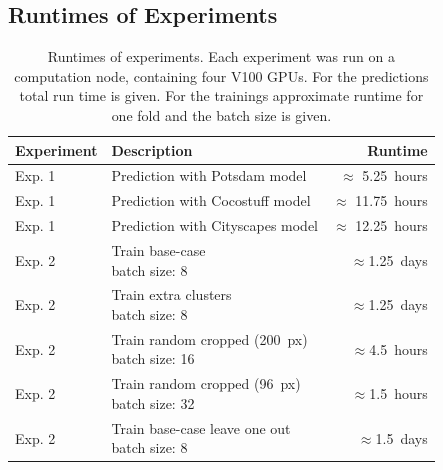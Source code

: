 \subsection{Runtimes of Experiments}
\begin{table}[!htb]
\centering
\makegapedcells
\begin{tabular}{|l|l|r|}
    \hline
    \textbf{Experiment} & \textbf{Description} & \textbf{Runtime} \\
    \hline
    Exp. 1 & Prediction with Potsdam model & $\approx$ 5.25~hours\\ \hline
    Exp. 1 & Prediction with Cocostuff model & $\approx$ 11.75~hours\\ \hline
    Exp. 1 & Prediction with Cityscapes model & $\approx$ 12.25~hours\\ \hline
    \hline
    Exp. 2 & \makecell[l]{Train base-case\\batch size: 8} & $\approx$1.25~days\\ \hline
    Exp. 2 & \makecell[l]{Train extra clusters\\batch size: 8} & $\approx$1.25~days\\ \hline
    Exp. 2 & \makecell[l]{Train random cropped (200~px)\\batch size: 16} & $\approx$4.5~hours\\ \hline
    Exp. 2 & \makecell[l]{Train random cropped (96~px)\\batch size: 32} & $\approx$1.5~hours\\ \hline
    Exp. 2 & \makecell[l]{Train base-case leave one out\\batch size: 8} & $\approx$1.5~days\\ \hline
\end{tabular}
\caption[Runtimes of Experiments]{Runtimes of experiments. Each experiment was run on a computation node, containing four V100 GPUs. For the predictions total run time is given. For the trainings approximate runtime for one fold and the batch size is given.}
\label{tab:runtimes}
\end{table}

\clearpage
